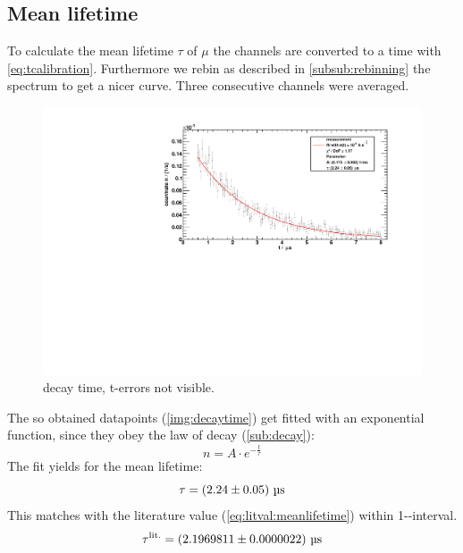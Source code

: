 \subsection{Mean lifetime}
To calculate the mean lifetime $\tau$ of $\mu$ the channels are converted to a time with \autoref{eq:tcalibration}. 
Furthermore we rebin as described in \ref{subsub:rebinning} the spectrum to get a nicer curve. Three consecutive channels were averaged.
\begin{figure}[H]
\begin{center}
  \includegraphics[width=\textwidth]{../img/decayTime.pdf}
  \caption{decay time, t-errors not visible.}
  \label{img:decaytime}
\end{center}
\end{figure}

The so obtained datapoints (\autoref{img:decaytime}) get fitted with an exponential function, since they obey the law of decay (\ref{sub:decay}):
\begin{equation}
    n = A \cdot e^{-\frac{t}{\tau}}
\end{equation}
The fit yields for the mean lifetime:
\begin{equation}
	\label{eq:result:meanlifetime}
    \tau = \left( 2.24 \pm 0.05 \right)\,\text{\textmu s}
\end{equation}
This matches with the literature value (\autoref{eq:litval:meanlifetime}) within 1-\textsigma-interval.
\begin{equation}
    \tau^{\text{lit.}} = \left( 2.1969811 \pm 0.0000022 \right)\,\text{\textmu s}
\end{equation}

